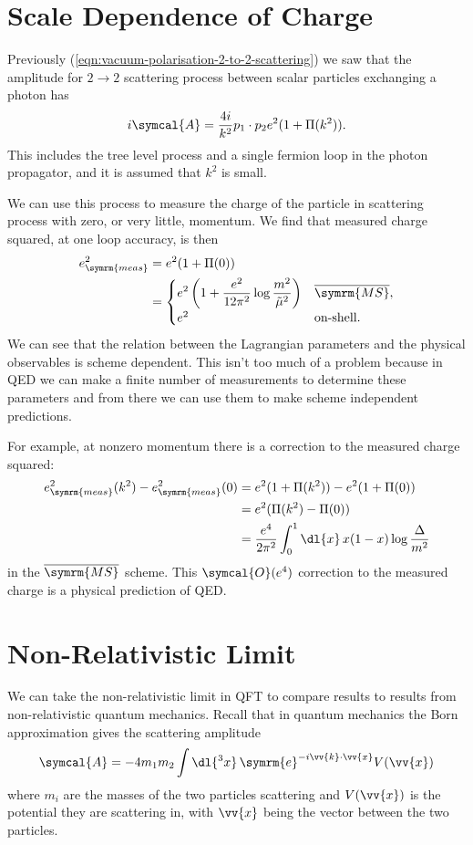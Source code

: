 \documentclass[fleqn]{NotesClass}
\newcommand{\MSbar}{\ensuremath{\overline{\symrm{MS}}}}
\newcommand{\e}{\symrm{e}}
\newcommand{\amplitude}{\symcal{A}}
\newcommand{\order}{\symcal{O}}
\newcommand{\measured}{\symrm{meas}}
\begin{document}
    \section{Scale Dependence of Charge}
    Previously (\cref{eqn:vacuum-polarisation-2-to-2-scattering}) we saw that the amplitude for \(2 \to 2\) scattering process between scalar particles exchanging a photon has
    \begin{equation}
        i\amplitude = \frac{4i}{k^2} p_1 \cdot p_2 e^2(1 + \Pi(k^2)).
    \end{equation}
    This includes the tree level process and a single fermion loop in the photon propagator, and it is assumed that \(k^2\) is small.
    
    We can use this process to measure the charge of the particle in scattering process with zero, or very little, momentum.
    We find that measured charge squared, at one loop accuracy, is then
    \begin{align}
        e_{\measured}^2 &= e^2(1 + \Pi(0))\\
        &= 
        \begin{cases}
            \displaystyle e^2\left( 1 + \frac{e^2}{12\pi^2} \log \frac{m^2}{\tilde{\mu}^2} \right) & \MSbar,\\
            e^2 & \text{on-shell}.
        \end{cases}
    \end{align}
    We can see that the relation between the Lagrangian parameters and the physical observables is scheme dependent.
    This isn't too much of a problem because in QED we can make a finite number of measurements to determine these parameters and from there we can use them to make scheme independent predictions.
    
    For example, at nonzero momentum there is a correction to the measured charge squared:
    \begin{align}
        e_{\measured}^2(k^2) - e_{\measured}^2(0) &= e^2(1 + \Pi(k^2)) - e^2(1 + \Pi(0))\\
        &= e^2(\Pi(k^2) - \Pi(0))\\
        &= \frac{e^4}{2\pi^2} \int_0^1 \dl{x} \, x(1 - x) \log \frac{\Delta}{m^2}
    \end{align}
    in the \MSbar{} scheme.
    This \(\order(e^4)\) correction to the measured charge is a physical prediction of QED.
    
    \section{Non-Relativistic Limit}
    We can take the non-relativistic limit in QFT to compare results to results from non-relativistic quantum mechanics.
    Recall that in quantum mechanics the Born approximation gives the scattering amplitude
    \begin{equation}
        \amplitude = -4m_1m_2 \int \dl{^3x} \, \e^{-i\vv{k} \cdot \vv{x}} V(\vv{x})
    \end{equation}
    where \(m_i\) are the masses of the two particles scattering and \(V(\vv{x})\) is the potential they are scattering in, with \(\vv{x}\) being the vector between the two particles.
    
\end{document}
